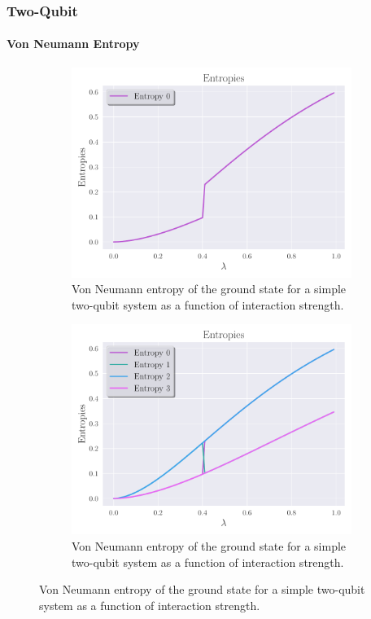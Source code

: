 \documentclass{beamer}
\begin{document}
\begin{frame}[t]
	\frametitle{Two-Qubit}
	\framesubtitle{Von Neumann Entropy}
	\begin{figure}[ht]
		\centering
		\begin{subfigure}[b]{0.45\textwidth}
		\begin{center}
			\includegraphics[width=\textwidth]{../src/plots/entropies-2-0.pdf}
		\end{center}
		\caption{Von Neumann entropy of the ground state for a simple two-qubit system as a function of interaction strength.}
		\label{fig:entropie-0}
		\end{subfigure}
		\hfill	
		\begin{subfigure}[b]{0.45\textwidth}
		\begin{center}
			\includegraphics[width=\textwidth]{../src/plots/entropies-2-cl.pdf}
		\end{center}
		\caption{Von Neumann entropy of the ground state for a simple two-qubit
system as a function of interaction strength.}
		\label{fig:entropie-4}
		\end{subfigure}
			
		\label{fig:-src-plots-entropies-2-cl-pdf}
	\end{figure}
	
\end{frame}
\end{document}
